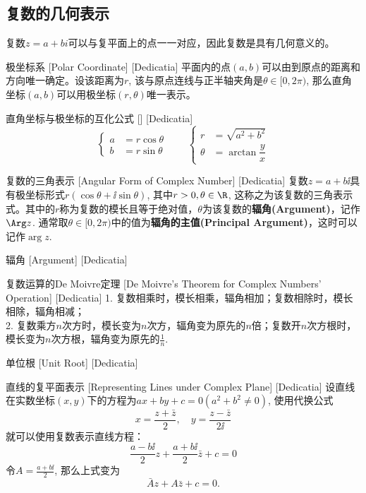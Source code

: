 \documentclass[UTF8]{ctexart}
\begin{document}
\subsection{复数的几何表示}
复数$z=a+bi$可以与复平面上的点一一对应，因此复数是具有几何意义的。
\begin{dfn}
    [UUID]
    {极坐标系}
    [Polar Coordinate]
    [Dedicatia]
    平面内的点$(a,b)$可以由到原点的距离和方向唯一确定。设该距离为$r$, 该与原点连线与正半轴夹角是$\theta\in[0,2\pi)$, 那么直角坐标$(a,b)$可以用极坐标$(r,\theta)$唯一表示。
\end{dfn}
\begin{ppt}
    [UUID]
    {直角坐标与极坐标的互化公式}
    []
    [Dedicatia]
    \[\begin{cases}
        a&=r\cos\theta\\
        b&=r\sin\theta
    \end{cases}\qquad\begin{cases}
        r&=\sqrt{a^2+b^2}\\
        \theta&=\arctan\dfrac{y}{x}
    \end{cases}\]
\end{ppt}
\begin{dfn}
    [AngularForm]
    {复数的三角表示}
    [Angular Form of Complex Number]
    [Dedicatia]
    复数$z=a+b\ii$具有极坐标形式$r(\cos\theta+\ii\sin\theta)$, 其中$r>0, \theta\in\R$, 这称之为该复数的三角表示式。其中的$r$称为复数的模长且等于绝对值，$\theta$为该复数的\textbf{辐角(Argument)}，记作$\Arg z$. 通常取$\theta\in[0,2\pi)$中的值为\textbf{辐角的主值(Principal Argument)}，这时可以记作$\arg{z}$.
\end{dfn}
\begin{dfn}
    [Argument]
    {辐角}
    [Argument]
    [Dedicatia]
\end{dfn}
\begin{thm}
    [UUID]
    {复数运算的De Moivre定理}
    [De Moivre's Theorem for Complex Numbers' Operation]
    [Dedicatia]
    1. 复数相乘时，模长相乘，辐角相加；复数相除时，模长相除，辐角相减；\\
    2. 复数乘方$n$次方时，模长变为$n$次方，辐角变为原先的$n$倍；复数开$n$次方根时，模长变为$n$次方根，辐角变为原先的$\frac{1}{n}$.
\end{thm}
\begin{dfn}
    [UUID]
    {单位根}
    [Unit Root]
    [Dedicatia]
\end{dfn}
\begin{dfn}
    [LineComplexRepresenting]
    {直线的复平面表示}
    [Representing Lines under Complex Plane]
    [Dedicatia]
    设直线在实数坐标$(x,y)$下的方程为$ax+by+c=0(a^2+b^2\neq 0)$, 使用代换公式
    \[x=\frac{z+\bar{z}}{2},\quad y=\frac{z-\bar{z}}{2\ii}\]
    就可以使用复数表示直线方程：
    \[\frac{a-b\ii}{2}z+\frac{a+b\ii}{2}\bar{z}+c=0\]
    令$A=\frac{a+b\ii}{2}$, 那么上式变为
    \[\bar{A}z+A\bar{z}+c=0.\]
\end{dfn}
\end{document}

